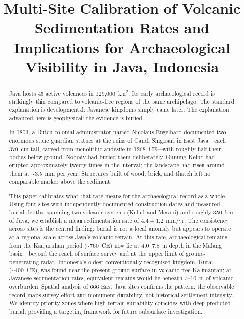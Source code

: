 \documentclass[egqsj, manuscript]{copernicus}
\begin{document}
\title{Multi-Site Calibration of Volcanic Sedimentation Rates and Implications for Archaeological Visibility in Java, Indonesia}





\received{}
\pubdiscuss{}
\revised{}
\accepted{}
\published{}


\maketitle

\begin{abstract}
Java hosts 45 active volcanoes in 129,000~km\textsuperscript{2}. Its early archaeological record is strikingly thin compared to volcanic-free regions of the same archipelago. The standard explanation is developmental: Javanese kingdoms simply came later. The explanation advanced here is geophysical: the evidence is buried.

In 1803, a Dutch colonial administrator named Nicolaus Engelhard documented two enormous stone guardian statues at the ruins of Candi Singosari in East Java---each 370~cm tall, carved from monolithic andesite in 1268~CE---with roughly half their bodies below ground. Nobody had buried them deliberately. Gunung Kelud had erupted approximately twenty times in the interval; the landscape had risen around them at \textasciitilde3.5~mm per year. Structures built of wood, brick, and thatch left no comparable marker above the sediment.

This paper calibrates what that rate means for the archaeological record as a whole. Using four sites with independently documented construction dates and measured burial depths, spanning two volcanic systems (Kelud and Merapi) and roughly 350~km of Java, we establish a mean sedimentation rate of $4.4 \pm 1.2$~mm/yr. The consistency across sites is the central finding: burial is not a local anomaly but appears to operate at a regional scale across Java's volcanic terrain. At this rate, archaeological remains from the Kanjuruhan period (\textasciitilde760~CE) now lie at 4.0--7.8~m depth in the Malang basin---beyond the reach of surface survey and at the upper limit of ground-penetrating radar. Indonesia's oldest conventionally recognized kingdom, Kutai (\textasciitilde400~CE), was found near the present ground surface in volcanic-free Kalimantan; at Javanese sedimentation rates, equivalent remains would lie beneath 7--10~m of volcanic overburden. Spatial analysis of 666 East Java sites confirms the pattern: the observable record maps survey effort and monument durability, not historical settlement intensity. We identify priority zones where high terrain suitability coincides with deep predicted burial, providing a targeting framework for future subsurface investigation.
\end{abstract}
\end{document}

